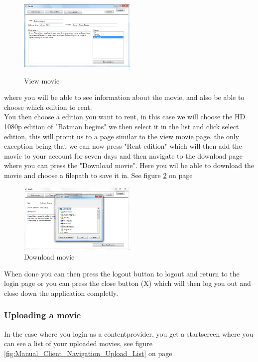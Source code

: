 \begin{figure}[h!]  
  \centering
\includegraphics[width=0.5\textwidth]{Parts/Images/Manual/Viewmovie}
\label{fig:Manual_Client_Navigation_Rent_View}
\caption{View movie}
\end{figure}
 
 where you will be able to see information about the movie, and also be able to choose which edition to rent.
\\ You then choose a edition you want to rent, in this case we will choose the HD 1080p edition of "Batman begins" we then select it in the list and click select edition, this will promt us to a page similar to the view movie page, the only exception being that we can now press "Rent edition" which will then add the movie to your account for seven days and then navigate to the download page where you can press the "Download movie". Here you wil be able to download the movie and choose a filepath to save it in. See figure \ref{fig:Manual_Client_Navigation_Rent_Download} on page \pageref{fig:Manual_Client_Navigation_Rent_Download}


\begin{figure}[h!]  
  \centering
\includegraphics[width=0.5\textwidth]{Parts/Images/Manual/Downloadmovie}
\caption{Download movie}
\label{fig:Manual_Client_Navigation_Rent_Download}
\end{figure}
 
 When done you can then press the logout button to logout and return to the login page or you can press the close button (X) which will then log you out and close down the application completly.

\subsubsection{Uploading a movie}
\label{Manual_Client_Navigation_Upload}
In the case where you login as a contentprovider, you get a startscreen where you can see a list of your uploaded movies, see figure
\ref{fig:Manual_Client_Navigation_Upload_List} on page \pageref{fig:Manual_Client_Navigation_Upload_List}


